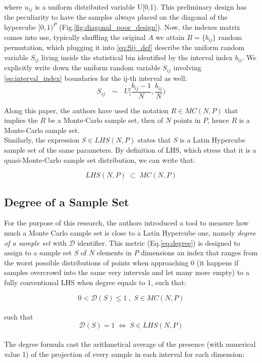 \documentclass[12pt]{extarticle}
\newcommand{\meqref}[1]{Eq.\ref{#1}}
\newcommand{\mfigref}[1]{Fig.\ref{#1}}
\begin{document}
where $u_{ij}$ is a uniform distributed variable U[0,1). This preliminary design has the peculiarity to have the samples always placed on the diagonal of the hypercube $[0,1)^P$ (\mfigref{fig:diagonal_poor_design}). Now, the indexes matrix comes into use, typically shuffling the original $A$ we attain $B = \{b_{ij}\}$ random permutation, which plugging it  into \cref{eq:Sij_def} describe the uniform random variable $S_{ij}$ living inside the statistical bin identified by the interval index $b_{ij}$. We explicitly write down the uniform random variable $S_{ij}$ involving \cref{eq:interval_index} boundaries for the ij-th interval as well: 
\begin{equation}
\label{eq:rand_variable_Sij}
S_{ij} \text{ $\sim$ } U\Big[\frac{b_{ij} - 1}{N}, \frac{b_{ij}}{N}\Big)
\end{equation}

Along this paper, the authors have used the notation $R \in MC(N, P)$ that implies the $R$ be a Monte-Carlo sample set, then of $N$ points in $P$, hence $R$ is a Monte-Carlo sample set. \\
Similarly, the expression $S \in LHS(N, P)$ states that $S$ is a Latin Hypercube sample set of the same parameters.
By definition of LHS, which stress that it is a quasi-Monte-Carlo sample set distribution, we can write that:

\begin{equation*}
LHS(N, P) \; \subset \; MC(N, P)
\end{equation*}

\subsection{Degree of a Sample Set}
\label{subsec:lhs_degree}
For the purpose of this research, the authors introduced a tool to measure how much a Monte Carlo sample set is close to a Latin Hypercube one, namely \textit{degree of a sample set} with $\mathcal{D}$ identifier. This metric (\meqref{eq:degree}) is designed to assign to a sample set $S$ of $N$ elements in $P$ dimensions an index that ranges from the worst possible distributions of points when approaching 0 (it happens if samples overcrowd into the same very intervals and let many more empty) to a fully conventional LHS when degree equals to 1, such that:

\begin{equation}
\label{eq:degree_range}
0 < \mathcal{D}(S) \leq 1 \;,\; S \in MC(N,P)
\end{equation}
\\
such that
\\
\begin{equation}
\label{eq:degree_of_lhs}
\mathcal{D}(S) = 1 \;\Leftrightarrow \; S \in LHS(N, P)
\end{equation}
\\
The degree formula cast the arithmetical average of the presence (with numerical value 1) of the projection of every sample in each interval for each dimension:
\end{document}
